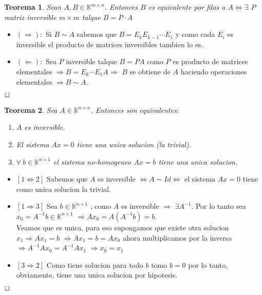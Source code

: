 \documentclass[]{article}
\newtheorem{theorem}{Teorema}
\newenvironment{proof}{\noindent{\bf Prueba:}}{$\hfill \Box$ \vspace{10pt}}
\begin{document}
\begin{theorem}
    Sean $A,B \in\mathbb{K}^{m\times n}$. Entonces $B$ es equivalente por filas a $A \iff \exists$ $P$ matriz inversible
    $m \times m$ talque $B=P \cdot A$  
\end{theorem}
\begin{proof}
    \begin{itemize}
        \item $(\Longrightarrow):$ Si $B \sim A$ sabemos que $B=E_kE_{k-1}\cdots E_1$ y como cada $E_i$ es inversible
        el producto de matrices inversibles tambien lo es.
        \item $(\Longleftarrow):$ Sea $P$ inversible talque $B=PA$ como $P$ es producto de matrices elementales
        $\Longrightarrow B=E_k \cdots E_1 A \Longrightarrow$ $B$ se obtiene de $A$ haciendo operaciones elementales
        $\Longrightarrow B \sim A$.  
    \end{itemize}
\end{proof}

\begin{theorem}
    Sea $A\in\mathbb{K}^{n\times n}$. Entonces son equivalentes: 
    \begin{enumerate}
        \item $A$ es inversible.
        \item El sistema $Ax=0$ tiene una unica solucion (la trivial).
        \item $\forall \: b \in\mathbb{K}^{n\times 1}$ el sistema no-homogeneo $Ax=b$ tiene una unica solucion.
    \end{enumerate}
\end{theorem}
\newpage
\begin{proof}
    \begin{itemize}
        \item $[1 \iff 2]$ Sabemos que $A$ es inversible $\iff A \sim Id \iff$ el sistema $Ax=0$ tiene
        como unica solucion la trivial.
        \item $[1 \Longrightarrow 3]$ Sea $b \in\mathbb{K}^{n\times 1}$ , como $A$ es inversible $\Longrightarrow$
        $\exists A^{-1}$. Por lo tanto sea $x_0= A^{-1}b \in\mathbb{K}^{n\times 1}$ $\Longrightarrow Ax_0=A(A^{-1}b)=b$.\\
        Veamos que es unica, para eso supongamos que existe otra solucion $x_1 \Longrightarrow Ax_1=b$
        $\Longrightarrow Ax_1=b=Ax_0$ ahora multiplicamos por la inversa $\Longrightarrow A^{-1}Ax_0=A^{-1}Ax_1$
        $\Longrightarrow x_0=x_1$
        \item $[3 \Longrightarrow 2]$ Como tiene solucion para todo $b$ tomo $b=0$ por lo tanto, obviamente, tiene una unica
        solucion por hipotesis. 
    \end{itemize}
\end{proof}
\end{document}
